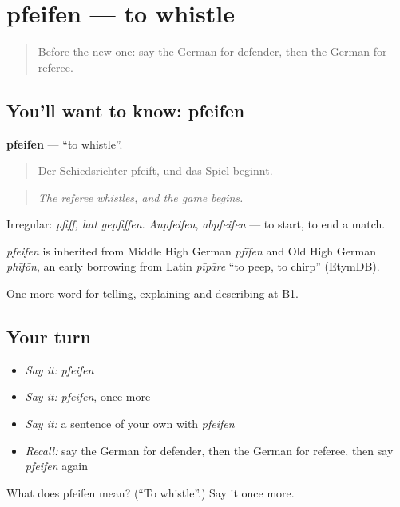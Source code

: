 \section[pfeifen]{pfeifen — to whistle}

\label{lesson:GE-C506-pfeifen}



\begin{quote}
Before the new one: say the German for defender, then the German for referee.
\end{quote}

\subsection*{You'll want to know: pfeifen}
\textbf{pfeifen} — \textquotedblleft{}to whistle\textquotedblright{}.

\begin{quote}
Der Schiedsrichter pfeift, und das Spiel beginnt.
\end{quote}

\begin{quote}
\emph{The referee whistles, and the game begins.}
\end{quote}

Irregular: \emph{pfiff, hat gepfiffen}. \emph{Anpfeifen}, \emph{abpfeifen} — to start, to end a match.

\begin{cousinweb}
\emph{pfeifen} is inherited from Middle High German \emph{pfīfen} and Old High German \emph{phīfōn}, an early borrowing from Latin \emph{pīpāre} \textquotedblleft{}to peep, to chirp\textquotedblright{} (EtymDB).
\end{cousinweb}

\begin{grammarlens}[title={What you've built}]
One more word for telling, explaining and describing at B1.
\end{grammarlens}

\subsection*{Your turn}
\begin{itemize}
\raggedright
  \item \emph{Say it:} \emph{pfeifen}
  \item \emph{Say it:} \emph{pfeifen}, once more
  \item \emph{Say it:} a sentence of your own with \emph{pfeifen}
  \item \emph{Recall:} say the German for defender, then the German for referee, then say \emph{pfeifen} again
\end{itemize}

\begin{tcolorbox}[breakable,colback=teal!4,colframe=teal!35!black,title={Before you move on}]
What does pfeifen mean? (\textquotedblleft{}To whistle\textquotedblright{}.) Say it once more.
\end{tcolorbox}
